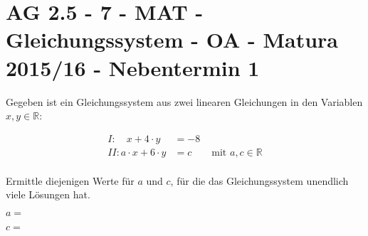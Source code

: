 \section{AG 2.5 - 7 - MAT - Gleichungssystem - OA - Matura 2015/16
- Nebentermin 1}

\begin{beispiel}[AG 2.5]{1} %
Gegeben ist ein Gleichungssystem aus zwei linearen Gleichungen in den Variablen $x,y \in \mathbb{R}$:

\begin{align*}
I: \quad x+4\cdot y &= -8 \\
II: a\cdot x +6 \cdot y &= c \qquad \text{mit }a,c \in \mathbb{R} \\
\end{align*}


Ermittle diejenigen Werte für $a$ und $c$, für die das Gleichungssystem unendlich viele Lösungen hat. \leer

$a=$ \leer

$c=$ 		
\end{beispiel}